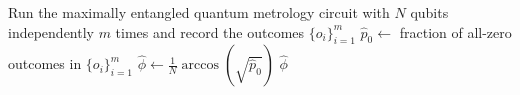 \begin{algorithm}
    \caption{Simulate $\hat \phi$ using the maximally entangled protocol}
    \label{alg:simulate}
    \begin{algorithmic}
        \State Run the maximally entangled quantum metrology circuit with $N$ qubits
        independently \textit{$m$} times and record the outcomes $\{o_i\}_{i=1}^m$
        \State $\hat p_0 \gets$ fraction of all-zero outcomes in $\{o_i\}_{i=1}^m$
        \State $\hat\phi \gets \frac 1 N \arccos(\sqrt{\hat p_0})$
        \State \Return $\hat\phi$
        \EndProcedure
    \end{algorithmic}
\end{algorithm}
